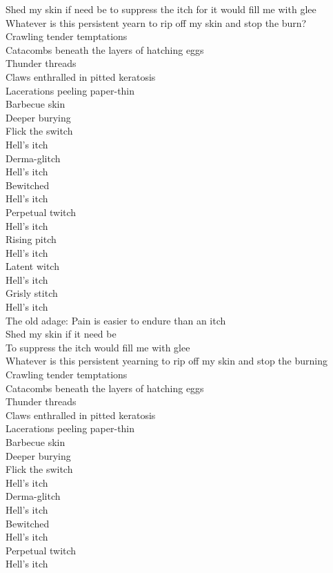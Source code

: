 Shed my skin if need be to suppress the itch for it would fill me with glee\\
Whatever is this persistent yearn to rip off my skin and stop the burn?\\
Crawling tender temptations\\
Catacombs beneath the layers of hatching eggs\\
Thunder threads\\
Claws enthralled in pitted keratosis\\
Lacerations peeling paper-thin\\
Barbecue skin\\
Deeper burying\\

Flick the switch\\
Hell's itch\\
Derma-glitch\\
Hell's itch\\
Bewitched\\
Hell's itch\\
Perpetual twitch\\
Hell's itch\\
Rising pitch\\
Hell's itch\\
Latent witch\\
Hell's itch\\
Grisly stitch\\
Hell's itch\\
The old adage: Pain is easier to endure than an itch\\

Shed my skin if it need be\\
To suppress the itch would fill me with glee\\
Whatever is this persistent yearning to rip off my skin and stop the burning\\
Crawling tender temptations\\
Catacombs beneath the layers of hatching eggs\\
Thunder threads\\
Claws enthralled in pitted keratosis\\
Lacerations peeling paper-thin\\
Barbecue skin\\
Deeper burying\\

Flick the switch\\
Hell's itch\\
Derma-glitch\\
Hell's itch\\
Bewitched\\
Hell's itch\\
Perpetual twitch\\
Hell's itch\\

